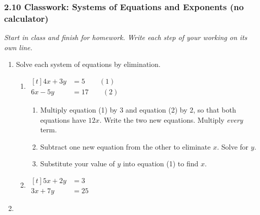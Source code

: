 \documentclass[12pt, twoside]{article}
\begin{document}
\subsubsection*{2.10 Classwork: Systems of Equations and Exponents (no calculator)}

\emph{Start in class and finish for homework. Write each step of your
working on its own line.}

\begin{enumerate}[itemsep=0.15cm]

\item[1.]
Solve each system of equations by elimination.

\begin{enumerate}[itemsep=0.15cm]
  \item $\begin{aligned}[t]
    4x + 3y &= 5 \qquad (1) \\
    6x - 5y &= 17 \qquad (2)
  \end{aligned}$
  \begin{enumerate}[label=(\roman*), itemsep=0.1cm]
    \item Multiply equation (1) by $3$ and equation (2) by $2$, so that
    both equations have $12x$. Write the two new equations. Multiply
    \emph{every} term. \vfill
    \item Subtract one new equation from the other to eliminate $x$.
    Solve for $y$. \vfill
    \item Substitute your value of $y$ into equation (1) to find $x$.
    \vfill
  \end{enumerate}
  \item $\begin{aligned}[t]
    5x + 2y &= 3 \\
    3x + 7y &= 25
  \end{aligned}$ \vfill
\end{enumerate}

\newpage

\item[2.]


\end{enumerate}
\end{document}
